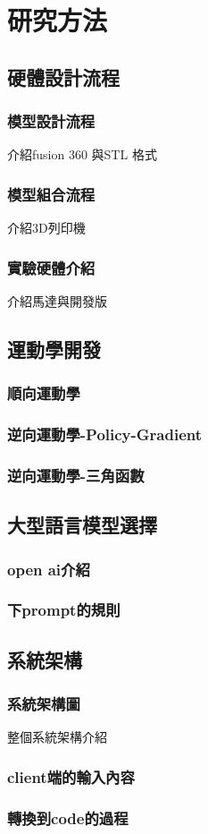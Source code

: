 \documentclass[class=NCU_thesis, crop=false]{standalone}
\begin{document}
\chapter{研究方法}

\section{硬體設計流程}
\subsection{模型設計流程}
介紹fusion 360 與STL 格式
\subsection{模型組合流程}
介紹3D列印機
\subsection{實驗硬體介紹}
介紹馬達與開發版

\section{運動學開發}
\subsection{順向運動學}
\subsection{逆向運動學-Policy-Gradient}
\subsection{逆向運動學-三角函數}

\section{大型語言模型選擇}
\subsection{open ai介紹}
\subsection{下prompt的規則}

\section{系統架構}
\subsection{系統架構圖}
整個系統架構介紹
\subsection{client端的輸入內容}
\subsection{轉換到code的過程}
\end{document}

